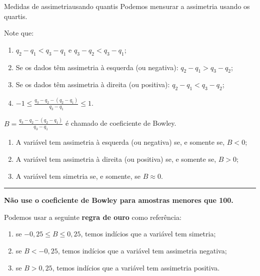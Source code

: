 \documentclass[
  10pt,
  ignorenonframetext,
]{beamer}
\providecommand{\tightlist}{%
  \setlength{\itemsep}{0pt}\setlength{\parskip}{0pt}}\usepackage{longtable,booktabs,array}
\newcommand*{\regrafina}{\rule{\textwidth}{0.5pt}}
\begin{document}
\begin{frame}{Medidas de assimetria\newline usando quantis}
\protect\hypertarget{medidas-de-assimetriausando-quantis}{}
Podemos mensurar a assimetria usando os quartis.

Note que:

\begin{enumerate}
\tightlist
\item
  \(q_2 - q_1 < q_3 - q_1\) e \(q_3 - q_2 < q_3 - q_1\);
\item
  Se os dados têm assimetria à esquerda (ou negativa):
  \(q_2 - q_1 > q_3 - q_2\);
\item
  Se os dados têm assimetria à direita (ou positiva):
  \(q_2 - q_1 < q_3 - q_2\);
\item
  \(-1 \leq \frac{q_3 - q_2 - (q_2 - q_1)}{q_3 - q_1} \leq 1\).
\end{enumerate}
\end{frame}

\begin{frame}
\(B = \frac{q_3 - q_2 - (q_2 - q_1)}{q_3 - q_1}\) é chamado de
coeficiente de Bowley.

\begin{enumerate}
\tightlist
\item
  A variável tem assimetria à esquerda (ou negativa) se, e somente se,
  \(B < 0\);
\item
  A variável tem assimetria à direita (ou positiva) se, e somente se,
  \(B > 0\);
\item
  A variável tem simetria se, e somente, se \(B \approx 0\).
\end{enumerate}

\regrafina

\textbf{Não use o coeficiente de Bowley para amostras menores que 100.}

Podemos usar a seguinte \textbf{regra de ouro} como referência:

\begin{enumerate}
\tightlist
\item
  se \(-0,25 \leq B \leq 0,25\), temos indícios que a variável tem
  simetria;
\item
  se \(B < -0,25\), temos indícios que a variável tem assimetria
  negativa;
\item
  se \(B > 0,25\), temos indícios que a variável tem assimetria
  positiva.
\end{enumerate}
\end{frame}
\end{document}
